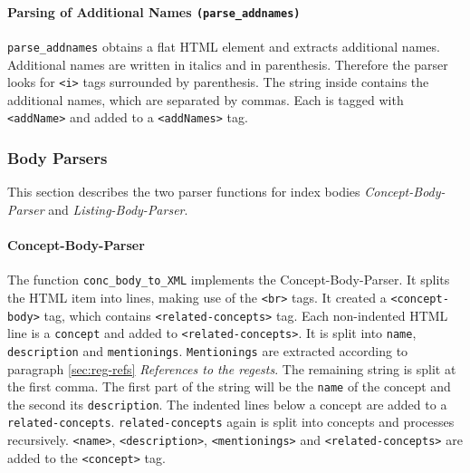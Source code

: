 \paragraph{Parsing of Additional Names \texttt{(parse\_addnames)}}
\label{sec:addNames}
\texttt{parse\_addnames} obtains a flat HTML element and extracts
additional names. Additional names are written in italics and in
parenthesis. Therefore the parser looks for \texttt{<i>} tags
surrounded by parenthesis. The string inside contains the additional
names, which are separated by commas. Each is tagged with
\texttt{<addName>} and added to a \texttt{<addNames>} tag.


\subsubsection{Body Parsers}
This section describes the two parser functions for index bodies
\textit{Concept-Body-Parser} and \textit{Listing-Body-Parser}.

\paragraph{Concept-Body-Parser}
\label{sec:conc-body-parser}
The function \texttt{conc\_body\_to\_XML} implements the
Concept-Body-Parser. It splits the HTML item into lines, making use of
the \texttt{<br>} tags. It created a \texttt{<concept-body>} tag,
which contains \texttt{<related-concepts>} tag. Each non-indented HTML
line is a \texttt{concept} and added to \texttt{<related-concepts>}.
It is split into \texttt{name}, \texttt{description} and
\texttt{mentionings}. \texttt{Mentionings} are extracted according to
paragraph \ref{sec:reg-refs} \textit{References to the regests}. The
remaining string is split at the first comma. The first part of the
string will be the \texttt{name} of the concept and the second its
\texttt{description}. The indented lines below a concept are added to
a \texttt{related-concepts}. \texttt{related-concepts} again is split
into concepts and processes recursively. \texttt{<name>},
\texttt{<description>}, \texttt{<mentionings>} and
\texttt{<related-concepts>} are added to the \texttt{<concept>} tag.

